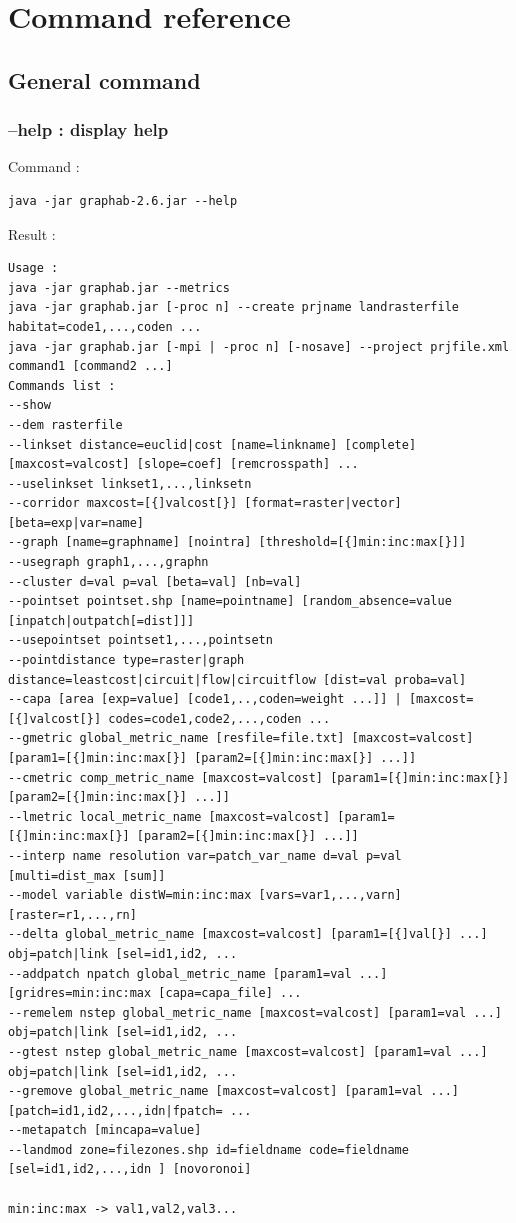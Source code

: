 \documentclass[a4paper,10pt]{report}
\begin{document}
\chapter{Command reference}
\section{General command}
\subsection{--help : display help}
Command :
\begin{Verbatim}
java -jar graphab-2.6.jar --help
\end{Verbatim}
Result :
\begin{verbatim}
Usage :
java -jar graphab.jar --metrics
java -jar graphab.jar [-proc n] --create prjname landrasterfile habitat=code1,...,coden ...
java -jar graphab.jar [-mpi | -proc n] [-nosave] --project prjfile.xml command1 [command2 ...]
Commands list :
--show
--dem rasterfile
--linkset distance=euclid|cost [name=linkname] [complete] [maxcost=valcost] [slope=coef] [remcrosspath] ...
--uselinkset linkset1,...,linksetn
--corridor maxcost=[{]valcost[}] [format=raster|vector] [beta=exp|var=name]
--graph [name=graphname] [nointra] [threshold=[{]min:inc:max[}]]
--usegraph graph1,...,graphn
--cluster d=val p=val [beta=val] [nb=val]
--pointset pointset.shp [name=pointname] [random_absence=value [inpatch|outpatch[=dist]]]
--usepointset pointset1,...,pointsetn
--pointdistance type=raster|graph distance=leastcost|circuit|flow|circuitflow [dist=val proba=val]
--capa [area [exp=value] [code1,..,coden=weight ...]] | [maxcost=[{]valcost[}] codes=code1,code2,...,coden ...
--gmetric global_metric_name [resfile=file.txt] [maxcost=valcost] [param1=[{]min:inc:max[}] [param2=[{]min:inc:max[}] ...]]
--cmetric comp_metric_name [maxcost=valcost] [param1=[{]min:inc:max[}] [param2=[{]min:inc:max[}] ...]]
--lmetric local_metric_name [maxcost=valcost] [param1=[{]min:inc:max[}] [param2=[{]min:inc:max[}] ...]]
--interp name resolution var=patch_var_name d=val p=val [multi=dist_max [sum]]
--model variable distW=min:inc:max [vars=var1,...,varn] [raster=r1,...,rn]
--delta global_metric_name [maxcost=valcost] [param1=[{]val[}] ...] obj=patch|link [sel=id1,id2, ...
--addpatch npatch global_metric_name [param1=val ...] [gridres=min:inc:max [capa=capa_file] ...
--remelem nstep global_metric_name [maxcost=valcost] [param1=val ...] obj=patch|link [sel=id1,id2, ...
--gtest nstep global_metric_name [maxcost=valcost] [param1=val ...] obj=patch|link [sel=id1,id2, ...
--gremove global_metric_name [maxcost=valcost] [param1=val ...] [patch=id1,id2,...,idn|fpatch= ...
--metapatch [mincapa=value]
--landmod zone=filezones.shp id=fieldname code=fieldname [sel=id1,id2,...,idn ] [novoronoi]

min:inc:max -> val1,val2,val3...
\end{verbatim}
\end{document}
